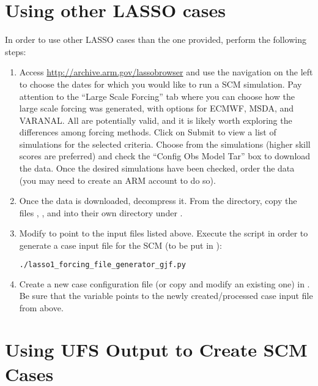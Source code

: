 \section{Using other LASSO cases}
\label{sec:lasso}

In order to use other LASSO cases than the one provided, perform the following steps:
\begin{enumerate}
\item Access \url{http://archive.arm.gov/lassobrowser} and use the navigation on the left to choose the dates for which you would like to run a SCM simulation. Pay attention to the ``Large Scale Forcing'' tab where you can choose how the large scale forcing was generated, with options for ECMWF, MSDA, and VARANAL. All are potentially valid, and it is likely worth exploring the differences among forcing methods. Click on Submit to view a list of simulations for the selected criteria. Choose from the simulations (higher skill scores are preferred) and check the ``Config Obs Model Tar'' box to download the data. Once the desired simulations have been checked, order the data (you may need to create an ARM account to do so).
\item Once the data is downloaded, decompress it. From the  directory, copy the files , , and  into their own directory under .
\item Modify  to point to the input files listed above. Execute the script in order to generate a case input file for the SCM (to be put in ):
\begin{lstlisting}[language=bash]
./lasso1_forcing_file_generator_gjf.py
\end{lstlisting}
\item Create a new case configuration file (or copy and modify an existing one) in . Be sure that the  variable points to the newly created/processed case input file from above.
\end{enumerate}

\section{Using UFS Output to Create SCM Cases}
\label{sec:UFScases}

